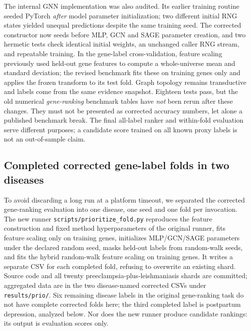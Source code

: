 \documentclass[11pt,a4paper]{article}
\begin{document}
The internal GNN implementation was also audited. Its earlier training routine seeded PyTorch \emph{after} model parameter initialization; two different initial RNG states yielded unequal predictions despite the same training seed. The corrected constructor now seeds before MLP, GCN and SAGE parameter creation, and two hermetic tests check identical initial weights, an unchanged caller RNG stream, and repeatable training. In the gene-label cross-validation, feature scaling previously used held-out gene features to compute a whole-universe mean and standard deviation; the revised benchmark fits these on training genes only and applies the frozen transform to its test fold. Graph topology remains transductive and labels come from the same evidence snapshot. Eighteen tests pass, but the old numerical \emph{gene-ranking} benchmark tables have \emph{not} been rerun after these changes. They must not be presented as corrected accuracy numbers, let alone a published benchmark break. The final all-label ranker and within-fold evaluation serve different purposes; a candidate score trained on all known proxy labels is not an out-of-sample claim.



\subsection{Completed corrected gene-label folds in two diseases}
To avoid discarding a long run at a platform timeout, we separated the corrected gene-ranking evaluation into one disease, one seed and one fold per invocation. The new runner \texttt{scripts/prioritize\_fold.py} reproduces the feature construction and fixed method hyperparameters of the original runner, fits feature scaling only on training genes, initializes MLP/GCN/SAGE parameters under the declared random seed, masks held-out labels from random-walk seeds, and fits the hybrid random-walk feature scaling on training genes. It writes a separate CSV for each completed fold, refusing to overwrite an existing shard. Source code and all twenty preeclampsia-plus-leishmaniasis shards are committed; aggregated data are in the two disease-named corrected CSVs under \texttt{results/prio/}. Six remaining disease labels in the original gene-ranking task do not have complete corrected folds here; the third completed label is postpartum depression, analyzed below. Nor does the new runner produce candidate rankings: its output is evaluation scores only.
\end{document}

